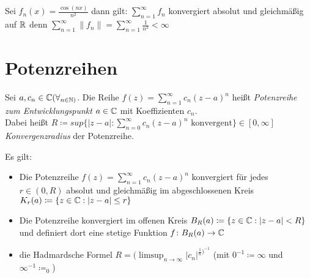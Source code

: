 \begin{example}
 Sei	$f_n(x)= \frac{\cos(nx)}{n^2}$ dann gilt: $\sum_{n=1}^{\infty}f_n$ konvergiert absolut und gleichmäßig auf $\mathbb{R}$ denn $\sum_{n=1}^{\infty} \|f_n\|= \sum_{n=1}^{\infty}	\frac{1}{n^2}<\infty$ 
\end{example}
\section{Potenzreihen}
\begin{definition}[Potenzreihen]
	Sei $a,c_n \in \mathbb{C} (\forall_{n \in \mathbb{N})} $. Die Reihe $f(z)=\sum_{n=1}^{\infty}c_n(z-a)^{n}$ heißt \emph{Potenzreihe zum Entwicklungspunkt $a \in \mathbb{C}$} mit Koeffizienten $c_n$. \\
	Dabei heißt $R \coloneqq sup \{|z-a| : \sum_{n=0}^{\infty}c_n(z-a)^{n} \text{ konvergent}\} \in [0,\infty]$ \emph{Konvergenzradius} der Potenzreihe.
\end{definition}
\begin{theorem}
	\label{thm:satz5}
	Es gilt:
	\begin{itemize}
		\item Die Potenzreihe $f(z) = \sum_{n=1}^{\infty}c_n(z-a)^n$ konvergiert für jedes $r \in (0,R)$ absolut und gleichmäßig im abgeschlossenen Kreis $K_r(a) \coloneqq \{z \in \mathbb{C} : |z-a| \le r\} $ 
		\item Die Potenzreihe konvergiert im offenen Kreis $B_R(a)\coloneqq \{z \in \mathbb{C} : |z-a| <R \} $ und definiert dort eine stetige Funktion $f \colon B_R(a) \to \mathbb{C} $
		\item die Hadmardsche Formel $R =(\limsup_{n \to \infty} |c_n|^{\frac{1}{n})^{-1}}$ (mit $0^{-1}\coloneqq \infty$ und $\infty^{-1}\coloneqq_0$)   
	\end{itemize}
\end{theorem}
